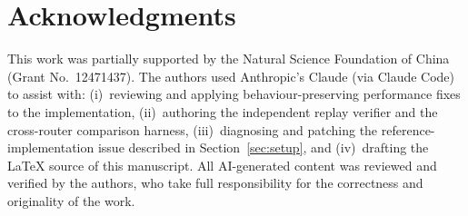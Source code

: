 \section*{Acknowledgments}
This work was partially supported by the Natural Science Foundation of China (Grant No.\ 12471437).
The authors used Anthropic's Claude (via Claude Code) to assist with:
(i)~reviewing and applying behaviour-preserving performance fixes to
the \PORTER{} implementation, (ii)~authoring the independent replay
verifier and the cross-router comparison harness, (iii)~diagnosing and
patching the \TeleSABRE{} reference-implementation issue described in
Section~\ref{sec:setup}, and (iv)~drafting the LaTeX source of
this manuscript. All AI-generated content was reviewed and verified by
the authors, who take full responsibility for the correctness and
originality of the work.

